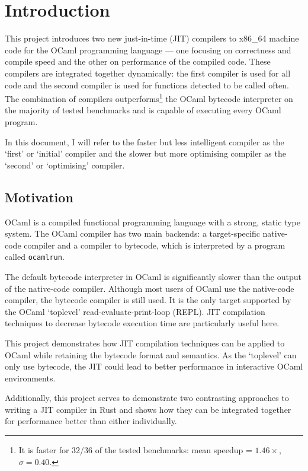 \chapter{Introduction}

This project introduces two new just-in-time (JIT) compilers to x86\_64 machine code for the OCaml
programming language --- one focusing on correctness and compile speed and the other on performance
of the compiled code. These compilers are integrated together dynamically: the first compiler is
used for all code and the second compiler is used for functions detected to be called often.  The
combination of compilers outperforms\footnote{It is faster for 32/36 of the tested benchmarks:
      mean speedup = $1.46\times$, $\sigma = 0.40$.} the OCaml bytecode interpreter on the majority
of
tested benchmarks and is capable of executing every OCaml program.

In this document, I will refer to the faster but less intelligent compiler as the `first' or
`initial' compiler and the slower but more optimising compiler as the `second' or `optimising'
compiler.

\section{Motivation}

OCaml is a compiled functional programming language with a strong, static type system. The OCaml
compiler has two main backends: a target-specific native-code compiler and a compiler to
bytecode, which is interpreted by a program called \texttt{ocamlrun}.

The default bytecode interpreter in OCaml is significantly slower than the output of the
native-code compiler. Although most users of OCaml use the native-code compiler, the bytecode
compiler is
still used. It is the only target supported by the OCaml `toplevel' read-evaluate-print-loop
(REPL).
JIT compilation techniques to decrease bytecode execution time are particularly useful here.

This project demonstrates how JIT compilation techniques can be applied to OCaml while retaining
the bytecode format and semantics. As the `toplevel' can only use
bytecode, the JIT could lead to better performance in interactive OCaml environments.

Additionally, this project serves to demonstrate two contrasting approaches to writing a JIT
compiler in Rust and shows how they can be integrated together for performance better than
either individually.

